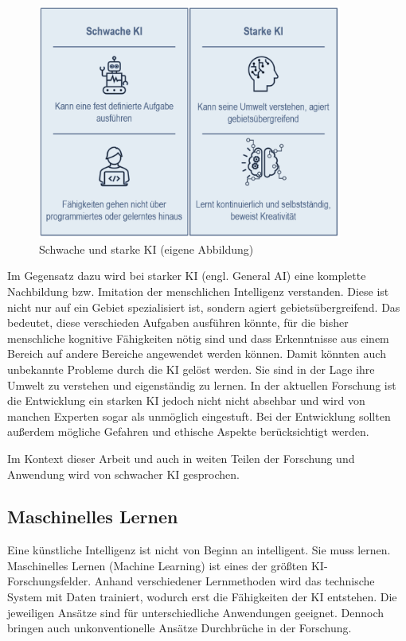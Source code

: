 \documentclass[a4paper,12pt, german]{report}
\begin{document}
\begin{figure}[H]
  \center
 \includegraphics[width=10cm]{images/starkeschwacheKI.png}
  \caption[Schwache und Starke KI]{Schwache und starke KI (eigene Abbildung)}
\end{figure}

Im Gegensatz dazu wird bei starker KI (engl. General AI) eine komplette Nachbildung bzw. Imitation der menschlichen Intelligenz verstanden. Diese ist nicht nur auf ein Gebiet spezialisiert ist, sondern agiert gebietsübergreifend. Das bedeutet, diese verschieden Aufgaben ausführen könnte, für die bisher menschliche kognitive Fähigkeiten nötig sind und dass Erkenntnisse aus einem Bereich auf andere Bereiche angewendet werden können. Damit könnten auch unbekannte Probleme durch die KI gelöst werden. Sie sind in der Lage ihre Umwelt zu verstehen und eigenständig zu lernen. In der aktuellen Forschung ist die Entwicklung ein starken KI jedoch nicht nicht absehbar und wird von manchen Experten sogar als unmöglich eingestuft. Bei der Entwicklung sollten außerdem mögliche Gefahren und ethische Aspekte berücksichtigt werden. 



Im Kontext dieser Arbeit und auch in weiten Teilen der Forschung und Anwendung wird von schwacher KI gesprochen. \cite{01}\cite{15}





\subsection{Maschinelles Lernen}

Eine künstliche Intelligenz ist nicht von Beginn an intelligent. Sie muss lernen. Maschinelles Lernen (Machine Learning) ist eines der größten KI-Forschungsfelder. Anhand verschiedener Lernmethoden wird das technische System mit Daten trainiert, wodurch erst die Fähigkeiten der KI entstehen. Die jeweiligen Ansätze sind für unterschiedliche Anwendungen geeignet. Dennoch bringen auch unkonventionelle Ansätze Durchbrüche in der Forschung. \newline
\end{document}
